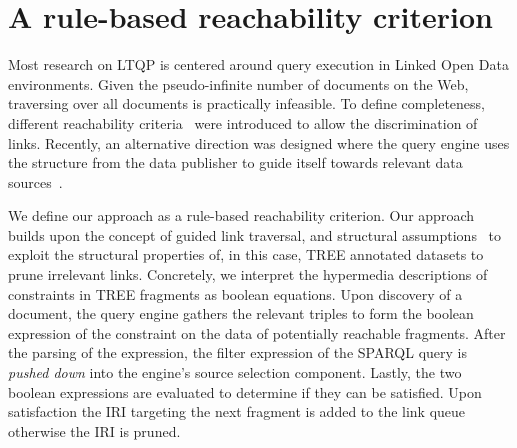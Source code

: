 \section{A rule-based reachability criterion}



Most research on LTQP is centered around query execution in Linked Open Data environments.
Given the pseudo-infinite number of documents on the Web, traversing over all documents is practically infeasible.
To define completeness, different reachability criteria~\cite{hartig2012} were introduced to allow the discrimination of links.
Recently, an alternative direction was designed where the query engine uses the structure from the data publisher to guide itself towards relevant data sources~\cite{taelman2023, verborgh2020}.

We define our approach as a rule-based reachability criterion.
Our approach builds upon the concept of guided link traversal, and structural assumptions~\cite{taelman2023} to exploit the structural properties of, in this case, TREE annotated datasets to prune irrelevant links.
Concretely, we interpret the hypermedia descriptions of constraints in TREE fragments as boolean equations.
Upon discovery of a document, the query engine gathers the relevant triples to form the boolean expression of the constraint on the data of potentially reachable fragments.
After the parsing of the expression, the filter expression of the SPARQL query is \textit{pushed down} into the engine's source selection component.
Lastly, the two boolean expressions are evaluated to determine if they can be satisfied. 
Upon satisfaction the IRI targeting the next fragment is added to the link queue otherwise the IRI is pruned.


